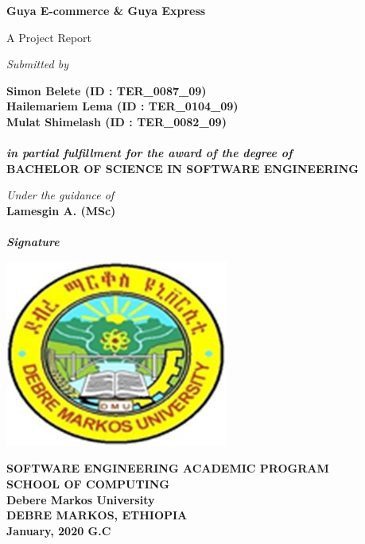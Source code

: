 \begin{titlepage}
\begin{center}
		\begin{LARGE}
			\bf{Guya E-commerce \& Guya Express\\}
		\end{LARGE}
		\vspace*{30pt}
		
		{\large A Project Report}
		\vspace{3.5\baselineskip}
		
		\textit{Submitted by}		
		
		\textbf{
			Simon Belete (ID : TER\_0087\_09)\\
			Hailemariem Lema (ID : TER\_0104\_09)\\
			Mulat Shimelash (ID : TER\_0082\_09)}\\		
		
		\textbf{\\
			\it{in partial fulfillment for the award of the degree of}\\}
		\vspace{20pt}
		\textbf{BACHELOR OF SCIENCE IN SOFTWARE ENGINEERING\\}
		
		\vspace{30pt}
		
		\vspace{30pt}
		\textit{Under the guidance of}\\
		\textbf{Lamesgin A.  (MSc)}\\
		\vspace{20pt}
		\textit{\textbf{\makebox[2in]{\hrulefill}}}\\
		\textit{\textbf{Signature}}
		
		
		\vspace{15pt}
		
		\includegraphics[scale=1]{images/dmu} 
		
		\textbf{SOFTWARE ENGINEERING ACADEMIC PROGRAM\\
			SCHOOL OF COMPUTING\\
			Debere Markos University\\
			DEBRE MARKOS, ETHIOPIA\\
			January, 2020 G.C
		}
	\end{center}
\end{titlepage}
